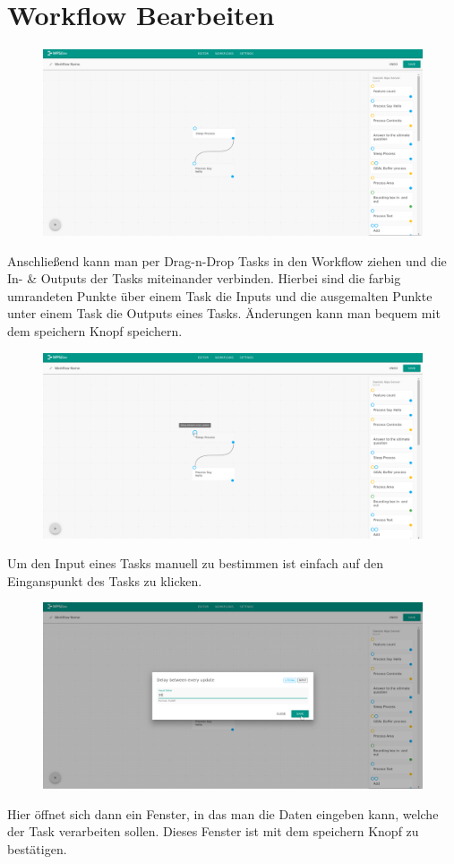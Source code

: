 \section{Workflow Bearbeiten}
    \begin{figure}[H]
        \centering
        \includegraphics[width=15.5cm]{images/Create Workflow.png}
        \label{create_workflow}
    \end{figure}
    Anschließend kann man per Drag-n-Drop Tasks in den Workflow ziehen und die In- \& Outputs der Tasks miteinander verbinden. Hierbei sind die farbig umrandeten Punkte über einem Task die Inputs und die ausgemalten Punkte unter einem Task die Outputs eines Tasks. Änderungen kann man bequem mit dem speichern Knopf speichern. 
    \begin{figure}[H]
        \centering
        \includegraphics[width=15.5cm]{images/Add Input 1.png}
        \label{add_input_1}
    \end{figure}
    Um den Input eines Tasks manuell zu bestimmen ist einfach auf den Einganspunkt des Tasks zu klicken.
    \begin{figure}[H]
        \centering
        \includegraphics[width=15.5cm]{images/Add Input 2.png}
        \label{add_input_2}
    \end{figure}
    Hier öffnet sich dann ein Fenster, in das man die Daten eingeben kann, welche der Task verarbeiten sollen. Dieses Fenster ist mit dem speichern Knopf zu bestätigen. 
